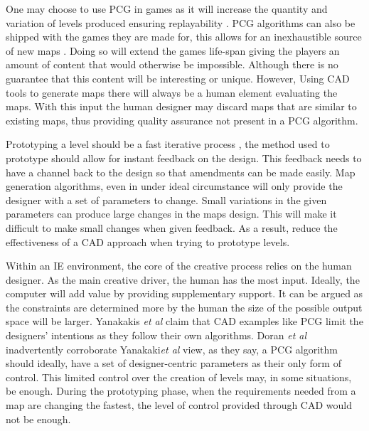\documentclass[journal]{IEEEtran}
\begin{document}
One may choose to use PCG in games as it will increase the quantity and variation of levels produced ensuring replayability \cite{karavolos2015mixed}. PCG algorithms can also be shipped with the games they are made for, this allows for an inexhaustible source of new maps \cite{johnson2010cellular}. Doing so will extend the games life-span giving the players an amount of content that would otherwise be impossible. Although there is no guarantee that this content will be interesting or unique.  However, Using CAD tools to generate maps there will always be a human element evaluating the maps. With this input the human designer may discard maps that are similar to existing maps, thus providing quality assurance not present in a PCG algorithm.

Prototyping a level should be a fast iterative process \cite{smith2011tanagra}, the method used to prototype should allow for instant feedback on the design. This feedback needs to have a channel back to the design so that amendments can be made easily. Map generation algorithms, even in under ideal circumstance will only provide the designer with a set of parameters to change\cite{doran2010controlled}. Small variations in the given parameters can produce large changes in the maps design\cite{regier2009random}. This will make it difficult to make small changes when given feedback. As a result, reduce the effectiveness of a CAD approach when trying to prototype levels.

Within an IE environment, the core of the creative process relies on the human designer. As the main creative driver, the human has the most input. Ideally, the computer will add value by providing supplementary support. It can be argued as the constraints are determined more by the human the size of the possible output space will be larger. Yanakakis \textit{et al} \cite{yannakakis2014mixed} claim that CAD examples like PCG limit the designers' intentions as they follow their own algorithms. Doran \textit{et al}\cite{doran2010controlled} inadvertently corroborate Yanakaki\textit{et al}\cite{yannakakis2014mixed} view, as they say, a PCG algorithm should ideally, have a set of designer-centric parameters as their only form of control. This limited control over the creation of levels may, in some situations, be enough. During the prototyping phase, when the requirements needed from a map are changing the fastest, the level of control provided through CAD would not be enough. 
\end{document}
